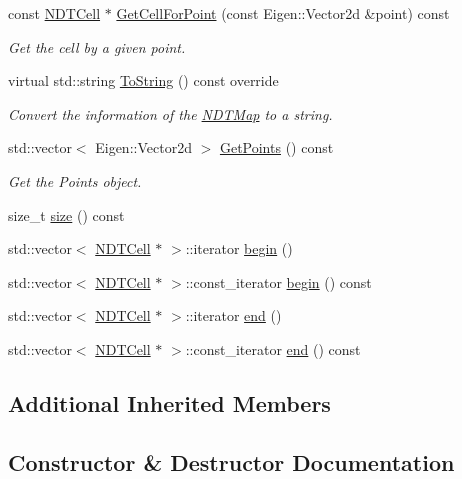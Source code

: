 \begin{DoxyCompactItemize}
const \hyperlink{classNDTCell}{N\+D\+T\+Cell} $\ast$ \hyperlink{classNDTMap_aa8c796e4bf0512e4d640887d228b2404}{Get\+Cell\+For\+Point} (const Eigen\+::\+Vector2d \&point) const
\begin{DoxyCompactList}\small\item\em Get the cell by a given point. \end{DoxyCompactList}\item 
virtual std\+::string \hyperlink{classNDTMap_a355a32d48208aa5bcc361b4be1d6320c}{To\+String} () const override
\begin{DoxyCompactList}\small\item\em Convert the information of the \hyperlink{classNDTMap}{N\+D\+T\+Map} to a string. \end{DoxyCompactList}\item 
std\+::vector$<$ Eigen\+::\+Vector2d $>$ \hyperlink{classNDTMap_a2b44ded259db4af8c4abffed0553e6c0}{Get\+Points} () const
\begin{DoxyCompactList}\small\item\em Get the Points object. \end{DoxyCompactList}\item 
size\+\_\+t \hyperlink{classNDTMap_aa9e3541e2f4c56ea43d598aef43e5503}{size} () const
\item 
std\+::vector$<$ \hyperlink{classNDTCell}{N\+D\+T\+Cell} $\ast$ $>$\+::iterator \hyperlink{classNDTMap_a94a3a8740a68aafca85872153ef68a40}{begin} ()
\item 
std\+::vector$<$ \hyperlink{classNDTCell}{N\+D\+T\+Cell} $\ast$ $>$\+::const\+\_\+iterator \hyperlink{classNDTMap_ad35b977c2c8e568da37787a529ae6df5}{begin} () const
\item 
std\+::vector$<$ \hyperlink{classNDTCell}{N\+D\+T\+Cell} $\ast$ $>$\+::iterator \hyperlink{classNDTMap_a10cc94926e3fc5ac31fa50f166eb3025}{end} ()
\item 
std\+::vector$<$ \hyperlink{classNDTCell}{N\+D\+T\+Cell} $\ast$ $>$\+::const\+\_\+iterator \hyperlink{classNDTMap_a248b578e22a0e8a0b3211df280fbe0a5}{end} () const
\end{DoxyCompactItemize}
\subsection*{Additional Inherited Members}


\subsection{Constructor \& Destructor Documentation}
\mbox{\label{classNDTMap_aec578016c17abfe085d0d4cf1dca1828}} 
